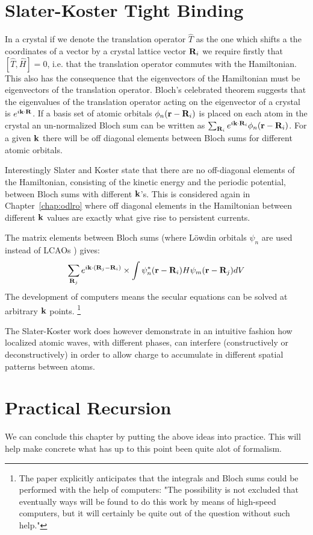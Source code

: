 \section{Slater-Koster Tight Binding}
  In a crystal if we denote the translation operator $\hat{T}$
as the one which shifts a the coordinates of a vector by a crystal lattice vector 
${\bf R}_{i}$ we require firstly that $[\hat{T},\hat{H}]=0$, i.e. that the 
translation operator commutes with the Hamiltonian. This also
has the consequence that the eigenvectors of the Hamiltonian
must be eigenvectors of the translation operator. Bloch's 
celebrated theorem suggests that the eigenvalues of the 
translation operator acting on the eigenvector of a crystal is $e^{i{\bf k}\cdot{\bf R}}$.
If a basis set of atomic orbitals $\phi_{n}({\bf r}-{\bf R}_{i})$
is placed on each atom in the crystal an un-normalized Bloch sum can be 
written as $\sum_{{\bf R}_{i}} e^{i{\bf k}\cdot{\bf R}_{i}}\phi_{n}({\bf r}-{\bf R}_{i})$. For
a given ${\bf k}$ there will be off diagonal elements between Bloch sums
for different atomic orbitals.

  Interestingly Slater and Koster state that there are no off-diagonal
elements of the Hamiltonian, consisting of the kinetic energy and the periodic potential, 
between Bloch sums with different ${\bf k}$'s. This is considered again in Chapter~\ref{chap:odlro}
where off diagonal elements in the Hamiltonian between different ${\bf k}$ values are exactly what give
rise to persistent currents.

The matrix elements between Bloch sums (where L\"owdin orbitals $\psi_{n}$ are used instead of LCAOs \cite{lowdin62}) gives:
%
\begin{equation}
\sum_{{\bf R}_{j}} e^{i{\bf k}\cdot({\bf R}_{j}-{\bf R}_{i})}\times\int \psi^{*}_{n}({\bf r}-{\bf R}_{i})H\psi_{m}({\bf r}-{\bf R}_{j})dV
\end{equation}
%
The development of computers means the secular equations can be solved 
at arbitrary ${\bf k}$ points. \footnote{The paper explicitly anticipates that the integrals and Bloch 
sums could be performed with the help of computers: "The possibility is not excluded 
that eventually ways will be found to do this work by means of high-speed computers, but
it will certainly be quite out of the question without such help."} 

The Slater-Koster work does however demonstrate in an intuitive fashion how localized atomic
waves, with different phases, can interfere (constructively or deconstructively) in order
to allow charge to accumulate in different spatial patterns between atoms.

\section{Practical Recursion}
We can conclude this chapter by putting the above ideas into practice.
This will help make concrete what has up to this point been quite alot of
formalism.

